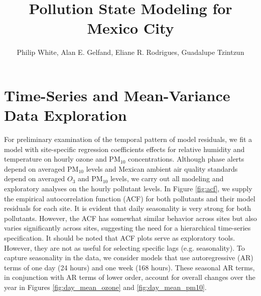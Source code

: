 \documentclass[alpha-refs]{wiley-article}
\title{Pollution State Modeling for Mexico City}
\author{Philip White, Alan E. Gelfand, Eliane R. Rodrigues, Guadalupe Tzintzun}
\begin{document}
\maketitle

\section{Time-Series and Mean-Variance Data Exploration }

For preliminary examination of the temporal pattern of model residuals, we fit a model with site-specific regression coefficients effects for relative humidity and temperature on hourly ozone and $\text{PM}_{10}$ concentrations. Although phase alerts depend on averaged $\text{PM}_{10}$ levels and Mexican ambient air quality standards depend on averaged $O_3$ and $\text{PM}_{10}$ levels, we carry out all modeling and exploratory analyses on the hourly pollutant levels. In Figure \ref{fig:acf}, we supply the empirical autocorrelation function (ACF) for both pollutants and their model residuals for each site. It is evident that daily seasonality is very strong for both pollutants. However, the ACF has somewhat similar behavior across sites but also varies significantly across sites, suggesting the need for a hierarchical time-series specification.
It should be noted that ACF plots serve as exploratory tools.  However, they are not as useful for selecting specific lags (e.g. seasonality). To capture seasonality in the data, we consider models that use autoregressive (AR) terms of one day (24 hours) and one week (168 hours). These seasonal AR terms, in conjunction with AR terms of lower order, account for overall changes over the year in Figures \ref{fig:day_mean_ozone} and \ref{fig:day_mean_pm10}.
\end{document}
